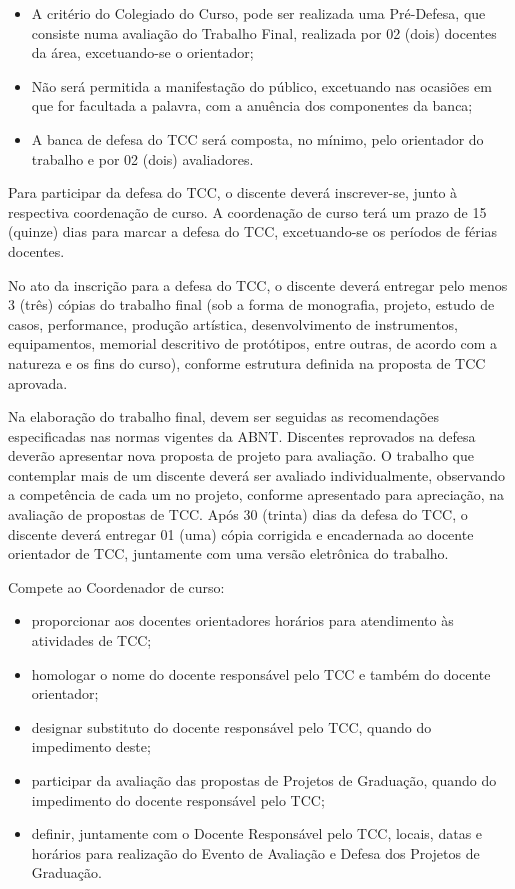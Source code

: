  \begin{itemize}
	\item A critério do Colegiado do Curso, pode ser realizada uma Pré-Defesa, que consiste numa avaliação do Trabalho Final, realizada por 02 (dois) docentes da área, excetuando-se o orientador;

	\item Não será permitida a manifestação do público, excetuando nas ocasiões em que for facultada a palavra, com a anuência dos componentes da banca;

	\item A banca de defesa do TCC será composta, no mínimo, pelo orientador do trabalho e por 02 (dois) avaliadores.
\end{itemize}

	Para participar da defesa do TCC, o discente deverá inscrever-se, junto à respectiva coordenação de curso.  A coordenação de curso terá um prazo de 15 (quinze) dias para marcar a defesa do TCC, excetuando-se os períodos de férias docentes. 
	
	No ato da inscrição para a defesa do TCC, o discente deverá entregar pelo menos 3 (três) cópias do trabalho final (sob a forma de monografia, projeto, estudo de casos, performance, produção artística, desenvolvimento de instrumentos, equipamentos, memorial descritivo de protótipos, entre outras, de acordo com a natureza e os fins do curso), conforme estrutura definida na proposta de TCC aprovada. 
	
	Na elaboração do trabalho final, devem ser seguidas as recomendações especificadas nas normas vigentes da ABNT. Discentes reprovados na defesa deverão apresentar nova proposta de projeto para avaliação. O trabalho que contemplar mais de um discente deverá ser avaliado individualmente, observando a competência de cada um no projeto, conforme apresentado para apreciação, na avaliação de propostas de TCC. Após 30 (trinta) dias da defesa do TCC, o discente deverá entregar 01 (uma) cópia corrigida e encadernada ao docente orientador de TCC, juntamente com uma versão eletrônica do trabalho. 

	Compete ao Coordenador de curso: 

\begin{itemize}
	\item proporcionar aos docentes orientadores horários para atendimento às atividades de TCC; 

	\item homologar o nome do docente responsável pelo TCC e também do docente orientador; 

	\item designar substituto do docente responsável pelo TCC, quando do impedimento deste; 

	\item participar da avaliação das propostas de Projetos de Graduação, quando do impedimento do docente responsável pelo TCC; 

	\item definir, juntamente com o Docente Responsável pelo TCC, locais, datas e horários para realização do Evento de Avaliação e Defesa dos Projetos de Graduação. 
\end{itemize}

